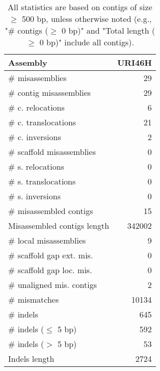 \documentclass[12pt,a4paper]{article}
\begin{document}
\begin{table}[ht]
\begin{center}
\caption{All statistics are based on contigs of size $\geq$ 500 bp, unless otherwise noted (e.g., "\# contigs ($\geq$ 0 bp)" and "Total length ($\geq$ 0 bp)" include all contigs).}
\begin{tabular}{|l*{1}{|r}|}
\hline
Assembly & URI46H \\ \hline
\# misassemblies & 29 \\ \hline
\hspace{2mm}\# contig misassemblies & 29 \\ \hline
\hspace{5mm}\# c. relocations & 6 \\ \hline
\hspace{5mm}\# c. translocations & 21 \\ \hline
\hspace{5mm}\# c. inversions & 2 \\ \hline
\hspace{2mm}\# scaffold misassemblies & 0 \\ \hline
\hspace{5mm}\# s. relocations & 0 \\ \hline
\hspace{5mm}\# s. translocations & 0 \\ \hline
\hspace{5mm}\# s. inversions & 0 \\ \hline
\# misassembled contigs & 15 \\ \hline
Misassembled contigs length & 342002 \\ \hline
\# local misassemblies & 9 \\ \hline
\# scaffold gap ext. mis. & 0 \\ \hline
\# scaffold gap loc. mis. & 0 \\ \hline
\# unaligned mis. contigs & 2 \\ \hline
\# mismatches & 10134 \\ \hline
\# indels & 645 \\ \hline
\hspace{5mm}\# indels ($\leq$ 5 bp) & 592 \\ \hline
\hspace{5mm}\# indels ($>$ 5 bp) & 53 \\ \hline
Indels length & 2724 \\ \hline
\end{tabular}
\end{center}
\end{table}
\end{document}
